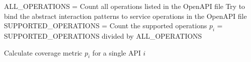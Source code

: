 \begin{algorithm}[H]
\LinesNumbered
{}
    ALL\_OPERATIONS = Count all operations listed in the OpenAPI file\;
    Try to bind the abstract interaction patterns to service operations in the OpenAPI file\;
    SUPPORTED\_OPERATIONS = Count the supported operations\;
    \(p_{i}\) = SUPPORTED\_OPERATIONS divided by ALL\_OPERATIONS 
 \caption{Calculate coverage metric \(p_{i}\) for a single API \(i\)}
 \label{alg:calc_p_i_for_single_api}
\end{algorithm}
